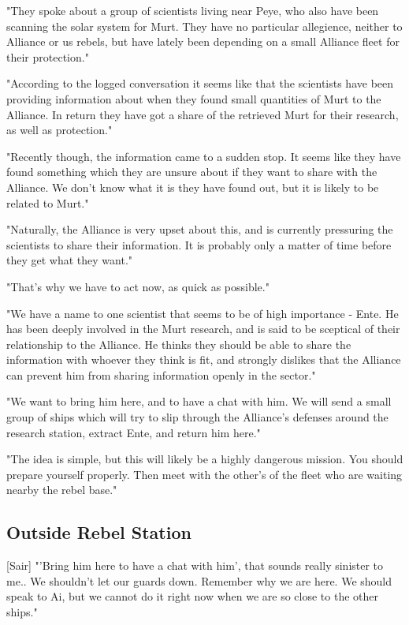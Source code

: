 \documentclass[a4paper,12pt]{article}
\begin{document}
"They spoke about a group of scientists living near Peye, who also have been scanning the solar system
for Murt. They have no particular allegience, neither to Alliance or us rebels, but have lately been depending on a small
Alliance fleet for their protection."

"According to the logged conversation it seems like that the scientists have been providing information about
when they found small quantities of Murt to the Alliance. In return they have got a share of the retrieved Murt for their
research, as well as protection."

"Recently though, the information came to a sudden stop. It seems like they have found something which they are unsure
about if they want to share with the Alliance. We don't know what it is they have found out, but it is likely to be related to
Murt."

"Naturally, the Alliance is very upset about this, and is currently pressuring the scientists to share their information. It is
probably only a matter of time before they get what they want."

"That's why we have to act now, as quick as possible."

"We have a name to one scientist that seems to be of high importance - Ente. He has been deeply involved in the Murt
research, and is said to be sceptical of their relationship to the Alliance. He thinks they should be able to share the information
with whoever they think is fit, and strongly dislikes that the Alliance can prevent him from sharing information openly in the sector."

"We want to bring him here, and to have a chat with him. We will send a small group of ships which will try to slip through
the Alliance's defenses around the research station, extract Ente, and return him here."

"The idea is simple, but this will likely be a highly dangerous mission. You should prepare yourself properly. Then meet with the
other's of the fleet who are waiting nearby the rebel base."

\subsection{Outside Rebel Station}

[Sair] "'Bring him here to have a chat with him', that sounds really sinister to me.. We shouldn't let our guards down.
Remember why we are here. We should speak to Ai, but we cannot do it right now when we are so close to the other ships."
\end{document}
